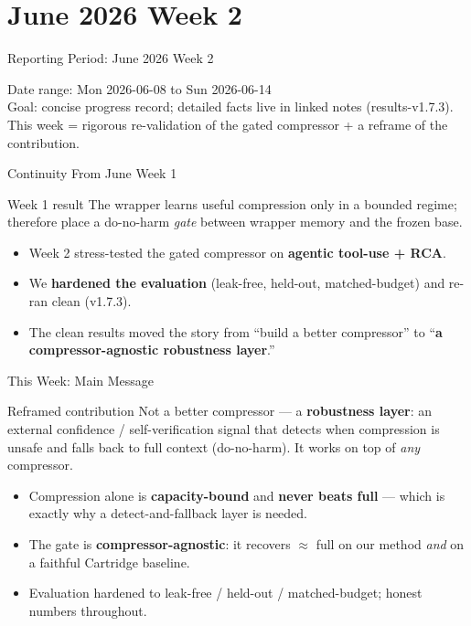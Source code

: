 
\section{June 2026 Week 2}

\begin{frame}{Reporting Period: June 2026 Week 2}
  \begin{center}
    \small Date range: Mon 2026-06-08 to Sun 2026-06-14 \\
    \scriptsize Goal: concise progress record; detailed facts live in linked notes (results-v1.7.3). \\
    \scriptsize This week = rigorous re-validation of the gated compressor + a reframe of the contribution.
  \end{center}
\end{frame}

\begin{frame}{Continuity From June Week 1}
  \begin{block}{Week 1 result}
    The wrapper learns useful compression only in a bounded regime; therefore place a
    do-no-harm \emph{gate} between wrapper memory and the frozen base.
  \end{block}
  \begin{itemize}
    \item Week 2 stress-tested the gated compressor on \textbf{agentic tool-use + RCA}.
    \item We \textbf{hardened the evaluation} (leak-free, held-out, matched-budget) and re-ran clean (v1.7.3).
    \item The clean results moved the story from ``build a better compressor'' to
      ``\textbf{a compressor-agnostic robustness layer}.''
  \end{itemize}
\end{frame}

\begin{frame}{This Week: Main Message}
  \begin{block}{Reframed contribution}
    Not a better compressor --- a \textbf{robustness layer}: an external confidence /
    self-verification signal that detects when compression is unsafe and falls back to full
    context (do-no-harm). It works on top of \emph{any} compressor.
  \end{block}
  \begin{itemize}
    \item Compression alone is \textbf{capacity-bound} and \textbf{never beats full} --- which is
      exactly why a detect-and-fallback layer is needed.
    \item The gate is \textbf{compressor-agnostic}: it recovers $\approx$ full on our method
      \emph{and} on a faithful Cartridge baseline.
    \item Evaluation hardened to leak-free / held-out / matched-budget; honest numbers throughout.
  \end{itemize}
\end{frame}

